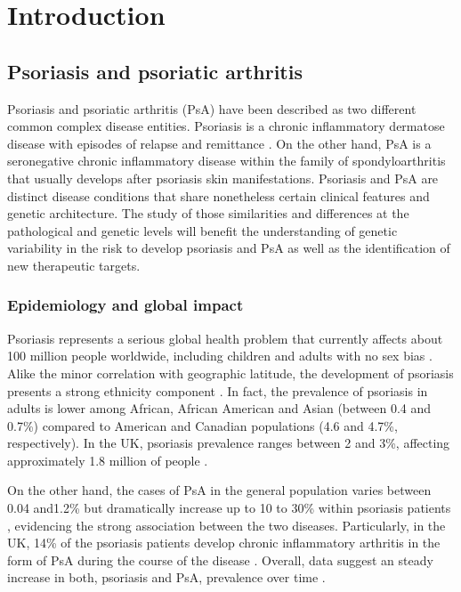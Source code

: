 \chapter{Introduction}
\label{ch:Intro}




\section{Psoriasis and psoriatic arthritis}
%
Psoriasis and psoriatic arthritis (PsA) have been described as two different common complex disease entities. Psoriasis is a chronic inflammatory dermatose disease with episodes of relapse and remittance \parencite{Nestle2009}. On the other hand, PsA is a seronegative chronic inflammatory disease within the family of spondyloarthritis \parencite{Moll1973, Coates2016} that usually develops after psoriasis skin manifestations\parencite{Villanova2016}. Psoriasis and PsA are distinct disease conditions that share nonetheless certain clinical features and genetic architecture. The study of those similarities and differences at the pathological and genetic levels will benefit the understanding of genetic variability in the risk to develop psoriasis and PsA as well as the identification of new therapeutic targets.


\subsection{Epidemiology and global impact}
%
Psoriasis represents a serious global health problem that currently affects about 100 million people worldwide, including children and adults with no sex bias \parencite{Organization2016}. Alike the minor correlation with geographic latitude, the development of psoriasis presents a strong ethnicity component \parencite{Jacobson2011}. In fact, the prevalence of psoriasis in adults is lower among African, African American and Asian (between 0.4 and 0.7\%) compared to American and Canadian populations (4.6 and 4.7\%, respectively). In the UK, psoriasis prevalence ranges between 2 and 3\%, affecting approximately 1.8 million of people \parencite{Perera2012}.

On the other hand, the cases of PsA in the general population varies between 0.04 and1.2\% \parencite{Perera2012} but dramatically increase up to 10 to 30\% within psoriasis patients \parencite{Gelfand2005,Reich2008}, evidencing the strong association between the two diseases. Particularly, in the UK, 14\% of the psoriasis patients develop chronic inflammatory arthritis in the form of PsA during the course of the disease \parencite{Ibrahim2009}. Overall, data suggest an steady increase in both, psoriasis and PsA, prevalence over time \parencite{Springate2007,Organization2016}.


